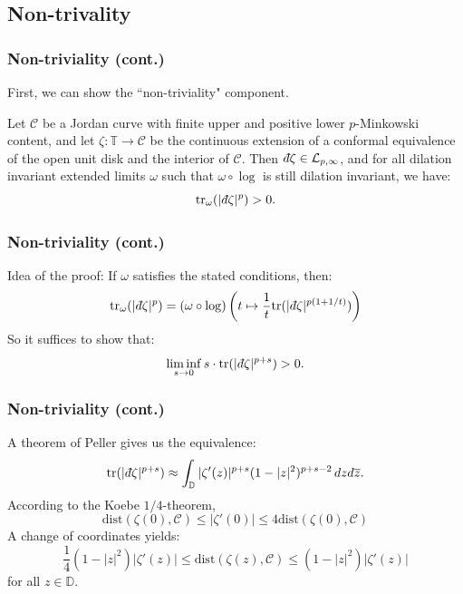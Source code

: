 \documentclass{beamer} %
\theoremstyle{definition} %
\newcommand{\Circ}{\mathbb{T}}
\newcommand{\Disc}{\mathbb{D}}
\newcommand{\Lc}{\mathcal{L}}
\newcommand{\tr}{\mathrm{tr}}
\newcommand{\dist}{\mathrm{dist}}
\def\qd{\,{\mathchar'26\mkern-12mu d}}
\begin{document}
\subsection{Non-trivality}

\begin{frame}\frametitle{Non-triviality (cont.)}
    First, we can show the ``non-triviality" component.
    \begin{theorem}
        Let $\mathcal{C}$ be a Jordan curve with finite upper and positive lower $p$-Minkowski content, and let $\zeta:\Circ\to \mathcal{C}$ be the continuous extension of a conformal equivalence of the open unit disk
        and the interior of $\mathcal{C}$. Then $\qd \zeta \in \Lc_{p,\infty}$, and for all dilation invariant extended limits $\omega$ such that $\omega\circ \log$ is still dilation invariant, we have:
        \begin{equation*}
            \tr_\omega(|\qd \zeta|^p) > 0.
        \end{equation*}
    \end{theorem}
\end{frame}

\begin{frame}\frametitle{Non-triviality (cont.)}
    Idea of the proof:    
    If $\omega$ satisfies the stated conditions, then:
    \begin{equation*}
        \tr_\omega(|\qd \zeta|^p) = (\omega\circ \log)\left(t\mapsto \frac{1}{t}\tr(|\qd \zeta|^{p(1+1/t)})\right)
    \end{equation*}
    So it suffices to show that:
    \begin{equation*}
        \liminf_{s\to 0} s\cdot \tr(|\qd \zeta|^{p+s}) > 0.
    \end{equation*}

\end{frame}

\begin{frame}\frametitle{Non-triviality (cont.)}
    A theorem of Peller gives us the equivalence:
    \begin{equation*}
        \tr(|\qd \zeta|^{p+s}) \approx \int_{\mathbb{D}} |\zeta'(z)|^{p+s}(1-|z|^2)^{p+s-2}\,dzd\overline{z}.
    \end{equation*}
    According to the Koebe $1/4$-theorem,
    \begin{equation*}
        \dist(\zeta(0),\mathcal{C}) \leq |\zeta'(0)| \leq 4\dist(\zeta(0),\mathcal{C})
    \end{equation*}
    A change of coordinates yields:
    \begin{equation*}
        \frac{1}{4}(1-|z|^2)|\zeta'(z)| \leq \dist(\zeta(z),\mathcal{C}) \leq (1-|z|^2)|\zeta'(z)|
    \end{equation*}
    for all $z \in \Disc$.    
\end{frame}
\end{document}
